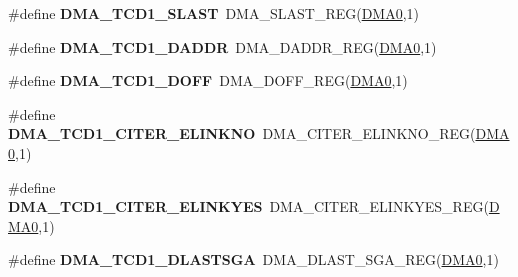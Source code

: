 \begin{DoxyCompactItemize}
\item 
\#define {\bfseries D\+M\+A\+\_\+\+T\+C\+D1\+\_\+\+S\+L\+A\+ST}~D\+M\+A\+\_\+\+S\+L\+A\+S\+T\+\_\+\+R\+EG(\hyperlink{group__DMA__Peripheral__Access__Layer_ga4103044f9ca209772f513dc694513ffb}{D\+M\+A0},1)\hypertarget{group__DMA__Register__Accessor__Macros_gac992fd61ac9973b0084946fe63e7ace5}{}\label{group__DMA__Register__Accessor__Macros_gac992fd61ac9973b0084946fe63e7ace5}

\item 
\#define {\bfseries D\+M\+A\+\_\+\+T\+C\+D1\+\_\+\+D\+A\+D\+DR}~D\+M\+A\+\_\+\+D\+A\+D\+D\+R\+\_\+\+R\+EG(\hyperlink{group__DMA__Peripheral__Access__Layer_ga4103044f9ca209772f513dc694513ffb}{D\+M\+A0},1)\hypertarget{group__DMA__Register__Accessor__Macros_ga9de728ad39398928b18756cb20c98d18}{}\label{group__DMA__Register__Accessor__Macros_ga9de728ad39398928b18756cb20c98d18}

\item 
\#define {\bfseries D\+M\+A\+\_\+\+T\+C\+D1\+\_\+\+D\+O\+FF}~D\+M\+A\+\_\+\+D\+O\+F\+F\+\_\+\+R\+EG(\hyperlink{group__DMA__Peripheral__Access__Layer_ga4103044f9ca209772f513dc694513ffb}{D\+M\+A0},1)\hypertarget{group__DMA__Register__Accessor__Macros_ga5357bc3c3f4f2ed192af2623a8599918}{}\label{group__DMA__Register__Accessor__Macros_ga5357bc3c3f4f2ed192af2623a8599918}

\item 
\#define {\bfseries D\+M\+A\+\_\+\+T\+C\+D1\+\_\+\+C\+I\+T\+E\+R\+\_\+\+E\+L\+I\+N\+K\+NO}~D\+M\+A\+\_\+\+C\+I\+T\+E\+R\+\_\+\+E\+L\+I\+N\+K\+N\+O\+\_\+\+R\+EG(\hyperlink{group__DMA__Peripheral__Access__Layer_ga4103044f9ca209772f513dc694513ffb}{D\+M\+A0},1)\hypertarget{group__DMA__Register__Accessor__Macros_ga9e0483f14cbe1f3dbacf9b8047cf810d}{}\label{group__DMA__Register__Accessor__Macros_ga9e0483f14cbe1f3dbacf9b8047cf810d}

\item 
\#define {\bfseries D\+M\+A\+\_\+\+T\+C\+D1\+\_\+\+C\+I\+T\+E\+R\+\_\+\+E\+L\+I\+N\+K\+Y\+ES}~D\+M\+A\+\_\+\+C\+I\+T\+E\+R\+\_\+\+E\+L\+I\+N\+K\+Y\+E\+S\+\_\+\+R\+EG(\hyperlink{group__DMA__Peripheral__Access__Layer_ga4103044f9ca209772f513dc694513ffb}{D\+M\+A0},1)\hypertarget{group__DMA__Register__Accessor__Macros_ga93fe722e1649c6b4bc4c6bccecdda99f}{}\label{group__DMA__Register__Accessor__Macros_ga93fe722e1649c6b4bc4c6bccecdda99f}

\item 
\#define {\bfseries D\+M\+A\+\_\+\+T\+C\+D1\+\_\+\+D\+L\+A\+S\+T\+S\+GA}~D\+M\+A\+\_\+\+D\+L\+A\+S\+T\+\_\+\+S\+G\+A\+\_\+\+R\+EG(\hyperlink{group__DMA__Peripheral__Access__Layer_ga4103044f9ca209772f513dc694513ffb}{D\+M\+A0},1)\hypertarget{group__DMA__Register__Accessor__Macros_ga8e7ae95d1847471177772eff5d38b78b}{}\label{group__DMA__Register__Accessor__Macros_ga8e7ae95d1847471177772eff5d38b78b}


\end{DoxyCompactItemize}
